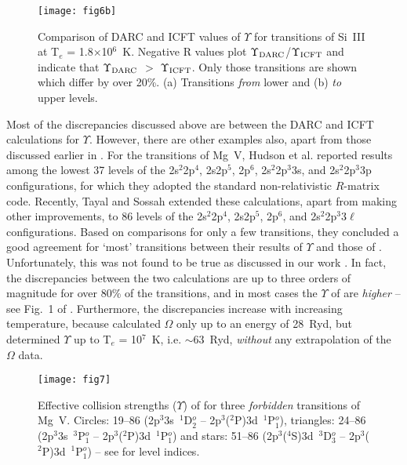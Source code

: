 \documentclass[fleqn]{article}
\begin{document}
\begin{figure*}
\texttt{[image: fig6b]}
 \vspace{-1.5cm}
 \caption{Comparison of DARC \cite{si3} and ICFT \cite{nrmglike}  values of $\Upsilon$ for transitions of Si~III at  T$_e$ = 1.8$\times$10$^6$~K. Negative R values plot  $\Upsilon_{\rm DARC}$/$\Upsilon_{\rm ICFT}$ and indicate that $\Upsilon_{\rm DARC}$ $>$ $\Upsilon_{\rm ICFT}$. Only those transitions are shown which differ by over 20\%. (a) Transitions {\em from} lower and (b) {\em to} upper levels.}
 \end{figure*}

Most of the discrepancies discussed above are between the DARC and ICFT calculations for $\Upsilon$. However, there are other examples also, apart from those discussed earlier in \cite{fst}. For the transitions of Mg~V, Hudson et al. \cite{hud} reported results among the lowest 37 levels of the 2s$^2$2p$^4$, 2s2p$^5$, 2p$^6$, 2s$^2$2p$^3$3s, and 2s$^2$2p$^3$3p configurations, for which they adopted the standard non-relativistic $R$-matrix code. Recently, Tayal and Sossah  \cite{sstmg5} extended these calculations, apart from making other improvements, to 86 levels of the  2s$^2$2p$^4$, 2s2p$^5$, 2p$^6$, and 2s$^2$2p$^3$3$\ell$ configurations. Based on comparisons for only a few transitions, they concluded  a good agreement for `most' transitions between their results of $\Upsilon$ and those of \cite{hud}. Unfortunately, this was not found  to be true as discussed in our work \cite{mgv}. In fact, the discrepancies between the two calculations are up to three orders of magnitude for over 80\% of the transitions, and in most cases the $\Upsilon$ of \cite{hud} are {\em higher} -- see Fig.~1 of \cite{mgv}. Furthermore, the discrepancies increase with increasing temperature, because \cite{hud} calculated  $\Omega$  only up to an energy of 28~Ryd, but determined $\Upsilon$  up to T$_e$ = 10$^7$~K, i.e. $\sim$63~Ryd, {\em without} any extrapolation of the $\Omega$ data.




\begin{figure*}
\texttt{[image: fig7]}
 \vspace{-1.5cm}
 \caption{Effective collision strengths ($\Upsilon$) of \cite{sstmg5} for three {\em forbidden} transitions of Mg~V. Circles: 19--86 (2p$^3$3s~$^1$D$^o_2$ -- 2p$^3$($^2$P)3d~$^1$P$^o_1$), triangles: 24--86 (2p$^3$3s~$^3$P$^o_1$ -- 2p$^3$($^2$P)3d~$^1$P$^o_1$) and stars: 51--86 (2p$^3$($^4$S)3d~$^3$D$^o_3$ -- 2p$^3$($^2$P)3d~$^1$P$^o_1$) -- see \cite{mgv} for level indices. }
 \end{figure*}
\end{document}

